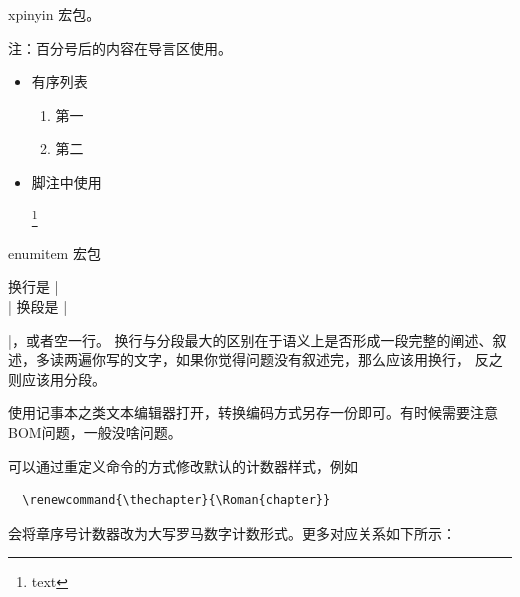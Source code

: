 
xpinyin 宏包。









注：百分号后的内容在导言区使用。
\begin{itemize}
  \item 有序列表
  \begin{texcode}
    \begin{enumerate}[label={\ding{\value*}},start=172]
      \item 第一
      \item 第二
    \end{enumerate}
  \end{texcode}
  \item 脚注中使用
  \begin{texcode}

    \footnote{text}
  \end{texcode}
\end{itemize}



enumitem 宏包



换行是 |\\| 换段是 |\par|，或者空一行。
换行与分段最大的区别在于语义上是否形成一段完整的阐述、叙述，多读两遍你写的文字，如果你觉得问题没有叙述完，那么应该用换行，
反之则应该用分段。



使用记事本之类文本编辑器打开，转换编码方式另存一份即可。有时候需要注意BOM问题，一般没啥问题。



可以通过重定义命令的方式修改默认的计数器样式，例如
\begin{verbatim}
  \renewcommand{\thechapter}{\Roman{chapter}}
\end{verbatim}
会将章序号计数器改为大写罗马数字计数形式。更多对应关系如下所示：

